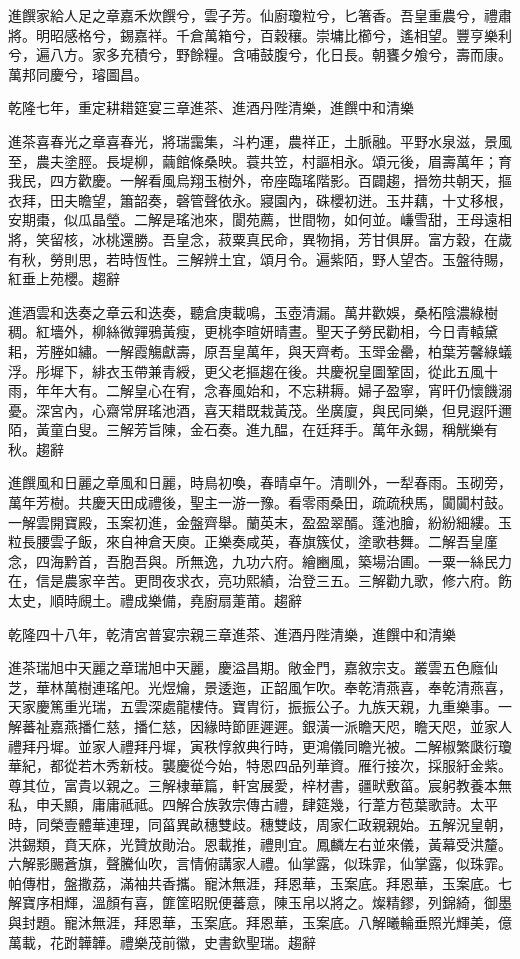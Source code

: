 \begin{pinyinscope}
進饌家給人足之章嘉禾炊饌兮，雲子芳。仙廚瓊粒兮，匕箸香。吾皇重農兮，禮肅將。明昭感格兮，錫嘉祥。千倉萬箱兮，百穀穰。崇墉比櫛兮，遙相望。豐亨樂利兮，遍八方。家多充積兮，野餘糧。含哺鼓腹兮，化日長。朝饔夕飧兮，壽而康。萬邦同慶兮，璿圖昌。

乾隆七年，重定耕耤筵宴三章進茶、進酒丹陛清樂，進饌中和清樂

進茶喜春光之章喜春光，將瑞靄集，斗杓運，農祥正，土脈融。平野水泉滋，景風至，農夫塗脛。長堤柳，繭館條桑映。蓑共笠，村謳相永。頌元後，眉壽萬年；育我民，四方歡慶。一解看風烏翔玉樹外，帝座臨瑤階影。百闢趨，搢笏共朝天，摳衣拜，田夫瞻望，簫韶奏，磬管聲依永。寢園內，硃櫻初迸。玉井藕，十丈移根，安期棗，似瓜晶瑩。二解是瑤池來，閬苑薦，世間物，如何並。嵰雪甜，王母遠相將，笑留核，冰桃還勝。吾皇念，菽粟真民命，異物捐，芳甘俱屏。富方穀，在歲有秋，勞則思，若時恆性。三解辨土宜，頌月令。遍紫陌，野人望杏。玉盤待賜，紅垂上苑櫻。趨辭

進酒雲和迭奏之章云和迭奏，聽倉庚載鳴，玉壺清漏。萬井歡娛，桑柘陰濃綠樹稠。紅墻外，柳絲微嚲鴉黃瘦，更桃李暄妍晴晝。聖天子勞民勸相，今日青轅黛耜，芳塍如繡。一解霞觴獻壽，原吾皇萬年，與天齊耇。玉斝金罍，柏葉芳馨綠蟻浮。彤墀下，緋衣玉帶兼青綬，更父老摳趨在後。共慶祝皇圖鞏固，從此五風十雨，年年大有。二解皇心在宥，念春風始和，不忘耕耨。婦子盈寧，宵旰仍懷饑溺憂。深宮內，心齋常屏瑤池酒，喜天耤既栽黃茂。坐廣廈，與民同樂，但見遐阡邇陌，黃童白叟。三解芳旨陳，金石奏。進九醖，在廷拜手。萬年永錫，稱觥樂有秋。趨辭

進饌風和日麗之章風和日麗，時鳥初喚，春晴卓午。清甽外，一犁春雨。玉砌旁，萬年芳樹。共慶天田成禮後，聖主一游一豫。看零雨桑田，疏疏秧馬，闐闐村鼓。一解雲開寶殿，玉案初進，金盤齊舉。蘭英末，盈盈翠醑。蓬池膾，紛紛細縷。玉粒長腰雲子飯，來自神倉天庾。正樂奏咸英，春旗簇仗，塗歌巷舞。二解吾皇廑念，四海黔首，吾胞吾與。所無逸，九功六府。繪豳風，築場治圃。一粟一絲民力在，信是農家辛苦。更問夜求衣，亮功熙績，治登三五。三解勸九歌，修六府。飭太史，順時覛土。禮成樂備，堯廚扇萐莆。趨辭

乾隆四十八年，乾清宮普宴宗親三章進茶、進酒丹陛清樂，進饌中和清樂

進茶瑞旭中天麗之章瑞旭中天麗，慶溢昌期。敞金門，嘉敘宗支。叢雲五色廕仙芝，華林萬樹連瑤戺。光煜爚，景逶迤，正韶風乍吹。奉乾清燕喜，奉乾清燕喜，天家慶篤重光瑞，五雲深處龍樓侍。寶胄衍，振振公子。九族天親，九重樂事。一解蕃祉嘉燕播仁慈，播仁慈，因緣時節匪遲遲。銀潢一派瞻天咫，瞻天咫，並家人禮拜丹墀。並家人禮拜丹墀，寅秩惇敘典行時，更鴻儀同瞻光被。二解椒繁瓞衍瓊華紀，都從若木秀新枝。襲慶從今始，特恩四品列華資。雁行接次，採服紆金紫。尊其位，富貴以親之。三解棣華篇，軒宮展愛，梓材書，疆畎敷菑。宸躬教養本無私，申夭顯，庸庸祗祗。四解合族敦宗傳古禮，肆筵幾，行葦方苞葉歌詩。太平時，同榮壹體華連理，同菑異畝穗雙歧。穗雙歧，周家仁政親親始。五解況皇朝，洪錫類，賁天庥，光贊放勛治。恩載推，禮則宜。鳳麟左右並來儀，黃幕受洪釐。六解影颺蒼旗，聲騰仙吹，言情俯講家人禮。仙掌露，似珠霏，仙掌露，似珠霏。帕傳柑，盤撒荔，滿袖共香攜。寵沐無涯，拜恩華，玉案底。拜恩華，玉案底。七解寶序相輝，溫顏有喜，篚筐昭貺便蕃意，陳玉帛以將之。燦精鏐，列錦綺，御墨與封題。寵沐無涯，拜恩華，玉案底。拜恩華，玉案底。八解曦輪垂照光輝美，億萬載，花跗韡韡。禮樂茂前徽，史書欽聖瑞。趨辭


\end{pinyinscope}
